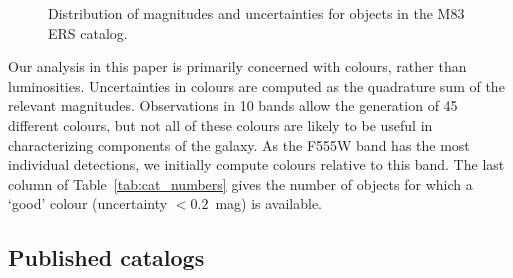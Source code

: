 \begin{figure}
\centering
{}
\hfill
{}
\caption{Distribution of magnitudes and uncertainties for objects in the \citet{chandar10} M83 ERS catalog.}
\label{fig:mag_unc}
\end{figure}

Our analysis in this paper is primarily concerned with colours, rather than luminosities.
Uncertainties in colours are computed as the quadrature sum of the relevant magnitudes.
Observations in 10 bands allow the generation of 45 different colours,
but not all of these colours are likely to be useful in characterizing components of the galaxy.
As the F555W band has the most individual detections, %
we initially compute colours relative to this band.
The last column of Table~\ref{tab:cat_numbers} gives the number of objects for which a `good' colour (uncertainty $<0.2$~mag) is available.

\subsection{Published catalogs}

